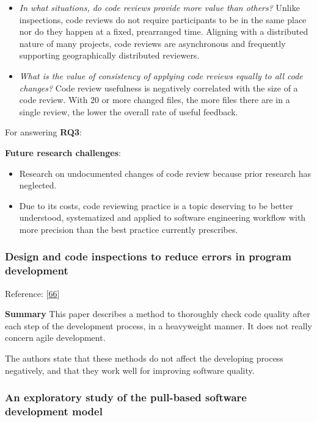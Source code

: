 \documentclass[]{book}
\providecommand{\tightlist}{%
  \setlength{\itemsep}{0pt}\setlength{\parskip}{0pt}}
\begin{document}
\begin{itemize}
\tightlist
\item
  \emph{In what situations, do code reviews provide more value than
  others?} Unlike inspections, code reviews do not require participants
  to be in the same place nor do they happen at a fixed, prearranged
  time. Aligning with a distributed nature of many projects, code
  reviews are asynchronous and frequently supporting geographically
  distributed reviewers.
\item
  \emph{What is the value of consistency of applying code reviews
  equally to all code changes?} Code review usefulness is negatively
  correlated with the size of a code review. With 20 or more changed
  files, the more files there are in a single review, the lower the
  overall rate of useful feedback.
\end{itemize}

For answering \textbf{RQ3}:

\textbf{Future research challenges}:

\begin{itemize}
\item
  Research on undocumented changes of code review because prior research
  has neglected.
\item
  Due to its costs, code reviewing practice is a topic deserving to be
  better understood, systematized and applied to software engineering
  workflow with more precision than the best practice currently
  prescribes.
\end{itemize}

\subsubsection{Design and code inspections to reduce errors in program
development}\label{design-and-code-inspections-to-reduce-errors-in-program-development}

Reference: {[}\protect\hyperlink{ref-fagan2002design}{66}{]}

\textbf{Summary} This paper describes a method to thoroughly check code
quality after each step of the development process, in a heavyweight
manner. It does not really concern agile development.

The authors state that these methods do not affect the developing
process negatively, and that they work well for improving software
quality.

\subsubsection{An exploratory study of the pull-based software
development
model}\label{an-exploratory-study-of-the-pull-based-software-development-model}
\end{document}
